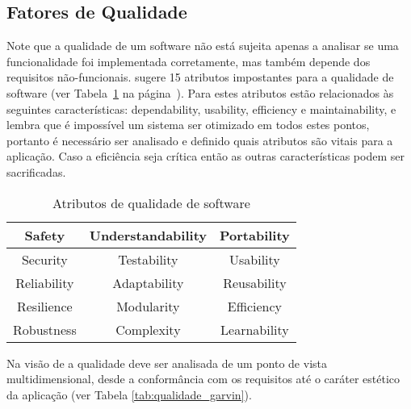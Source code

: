 \documentclass[
	12pt,				%
	openright,			%
	twoside,			%
	a4paper,			%
	english,			%
	brazil,				%
	]{abntex2}
\begin{document}
\subsection{Fatores de Qualidade}

Note que a qualidade de um software não está sujeita apenas a analisar se uma funcionalidade foi implementada corretamente, mas também depende dos requisitos não-funcionais.  sugere 15 atributos impostantes para a qualidade de software (ver Tabela~\ref{tab:atributos_qualidade} na página~\pageref{tab:atributos_qualidade}). Para  estes atributos estão relacionados às seguintes características: dependability, usability, efficiency e maintainability, e lembra que é impossível um sistema ser otimizado em todos estes pontos, portanto é necessário ser analisado e definido quais atributos são vitais para a aplicação. Caso a eficiência seja crítica então as outras características podem ser sacrificadas.

\begin{table}[h]
    \centering
    \caption{Atributos de qualidade de software}
    \label{tab:atributos_qualidade}
    \begin{tabular}{c|c|c}
        Safety & Understandability & Portability \\ \hline
        Security & Testability & Usability \\ \hline
        Reliability & Adaptability & Reusability \\ \hline
        Resilience & Modularity & Efficiency \\ \hline
        Robustness & Complexity & Learnability
    \end{tabular}
\end{table}


Na visão de  a qualidade deve ser analisada de um ponto de vista multidimensional, desde a conformância com os requisitos até o caráter estético da aplicação (ver Tabela \ref{tab:qualidade_garvin}). 
\end{document}
